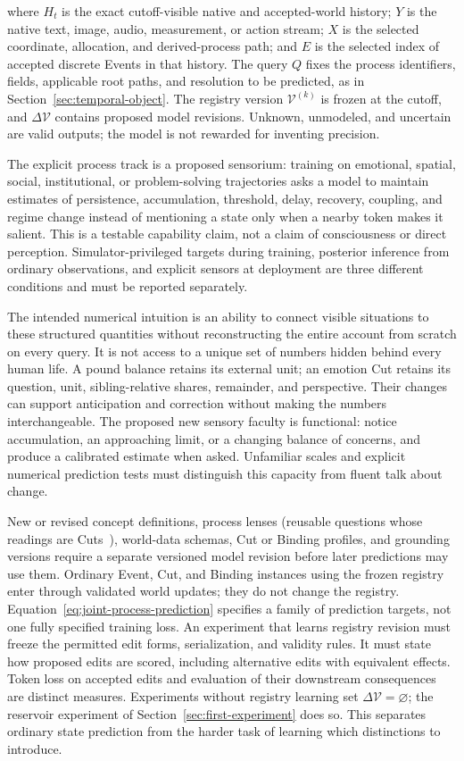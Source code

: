 \documentclass[10pt]{article}
\begin{document}
where $H_t$ is the exact cutoff-visible native and accepted-world history;
$Y$ is the native text, image, audio, measurement, or action stream; $X$ is the
selected coordinate, allocation, and derived-process path; and $E$ is the
selected index of accepted discrete Events in that history. The query $Q$ fixes the process
identifiers, fields, applicable root paths, and resolution to be predicted, as in
Section~\ref{sec:temporal-object}. The registry version $\mathcal V^{(k)}$ is
frozen at the cutoff, and $\Delta\mathcal V$ contains proposed model revisions. Unknown, unmodeled, and uncertain are valid
outputs; the model is not rewarded for inventing precision.

The explicit process track is a proposed sensorium: training on emotional,
spatial, social, institutional, or problem-solving trajectories asks a model to
maintain estimates of persistence, accumulation, threshold, delay, recovery,
coupling, and regime change instead of mentioning a state only when a nearby
token makes it salient. This is a testable capability claim, not a claim of
consciousness or direct perception. Simulator-privileged targets during
training, posterior inference from ordinary observations, and explicit sensors
at deployment are three different conditions and must be reported separately.

The intended numerical intuition is an ability to connect visible situations
to these structured quantities without reconstructing the entire account from
scratch on every query. It is not access to a unique set of numbers hidden
behind every human life. A pound balance retains its external unit; an emotion Cut retains its question, unit,
sibling-relative shares, remainder, and perspective.
Their changes can support anticipation and correction without making the
numbers interchangeable. The proposed new sensory faculty is functional:
notice accumulation, an approaching limit, or a changing balance of concerns,
and produce a calibrated estimate when asked. Unfamiliar scales and explicit
numerical prediction tests must distinguish this capacity from fluent talk
about change.

New or revised concept definitions, process lenses (reusable questions whose readings are
Cuts~\cite{westerbergMeaning2026}), world-data schemas, Cut or
Binding profiles, and grounding versions require a separate versioned model
revision before later predictions may use them. Ordinary Event, Cut, and Binding
instances using the frozen registry enter through validated world updates;
they do not change the registry.
Equation~\ref{eq:joint-process-prediction} specifies a family of prediction targets, not one fully specified training loss. An experiment that learns
registry revision must freeze the permitted edit forms, serialization, and
validity rules. It must state how proposed edits are scored, including
alternative edits with equivalent effects. Token loss on accepted edits and
evaluation of their downstream consequences are distinct measures. Experiments
without registry learning set $\Delta\mathcal V=\varnothing$; the reservoir
experiment of Section~\ref{sec:first-experiment} does so. This separates ordinary state prediction from the harder task
of learning which distinctions to introduce.
\end{document}
